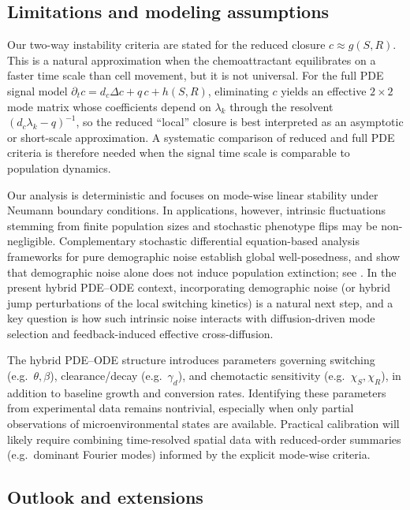\documentclass[pdflatex,sn-mathphys-ay]{sn-jnl}
\theoremstyle{thmstyleone}
\theoremstyle{definition}
\theoremstyle{remark}
\begin{document}
\subsection{Limitations and modeling assumptions}


Our two-way instability criteria are stated for the reduced closure $c\approx g(S,R)$.
This is a natural approximation when the chemoattractant equilibrates on a faster time scale than cell movement, but it is not universal.
For the full PDE signal model $\partial_t c=d_c\Delta c+q\,c+h(S,R)$, eliminating $c$ yields an effective $2\times2$ mode matrix whose
coefficients depend on $\lambda_k$ through the resolvent $(d_c\lambda_k-q)^{-1}$, so the reduced ``local'' closure is best interpreted as
an asymptotic or short-scale approximation. A systematic comparison of reduced and full PDE criteria is therefore needed when the signal
time scale is comparable to population dynamics.

Our analysis is deterministic and focuses on mode-wise linear stability under Neumann boundary conditions.
In applications, however, intrinsic fluctuations stemming from finite population sizes and stochastic phenotype flips may be non-negligible.
Complementary stochastic differential equation-based analysis frameworks for 
pure demographic noise establish global well-posedness,
and show that demographic noise alone does not induce population extinction; see \citep{abundo_stochastic_1991,wang_analysis_2025-1}.
In the present hybrid PDE--ODE context, incorporating demographic noise (or hybrid jump perturbations of the local
switching kinetics) is a natural next step, and a key question is how such intrinsic noise interacts with diffusion-driven
mode selection and feedback-induced effective cross-diffusion.

The hybrid PDE--ODE structure introduces parameters governing switching (e.g.\ $\theta,\beta$), clearance/decay (e.g.\ $\gamma_d$),
and chemotactic sensitivity (e.g.\ $\chi_S,\chi_R$), in addition to baseline growth and conversion rates.
Identifying these parameters from experimental data remains nontrivial, especially when only partial observations of microenvironmental
states are available. Practical calibration will likely require combining time-resolved spatial data with reduced-order summaries (e.g.\
dominant Fourier modes) informed by the explicit mode-wise criteria.

\subsection{Outlook and extensions}
\end{document}
